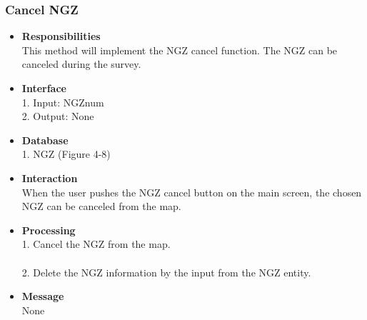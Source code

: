 \documentclass[11pt, a4paper]{article}
\begin{document}
\subsubsection{Cancel NGZ }
\begin{itemize}
\item {\bfseries Responsibilities }\\
This method will implement the NGZ cancel function. The NGZ can be canceled during the survey.\\

\item {\bfseries Interface }\\
1. Input: NGZnum\\
2. Output: None\\

\item {\bfseries Database }\\
1. NGZ (Figure 4-8)\\

\item {\bfseries Interaction }\\
When the user pushes the NGZ cancel button on the main screen, the chosen NGZ can be canceled from the map.\\

\item {\bfseries Processing }\\
1. Cancel the NGZ from the map.\\
\\
2. Delete the NGZ information by the input from the NGZ entity.

\item {\bfseries Message }\\
None
\end{itemize}

\end{document}
